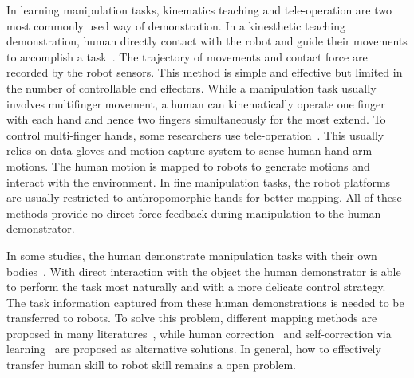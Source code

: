 In learning manipulation tasks, kinematics teaching and tele-operation are two most commonly used way of demonstration. In a kinesthetic teaching demonstration, human directly contact with the robot and guide their movements to accomplish a task~\cite{korkinof2013online,pais2014encoding,pastor2011skill,Miao2014}. The trajectory of movements and contact force are recorded by the robot sensors.
This method is simple and effective but limited in the number of controllable end effectors. While a manipulation task usually involves multifinger movement, a human can kinematically operate one finger with each hand and hence two fingers simultaneously for the most extend. To control multi-finger hands, some researchers use tele-operation~\cite{bernardino2013precision,kondo2008recognition,Fischer98}. This usually relies on data gloves and motion capture system to sense human hand-arm motions. The human motion is mapped to robots to generate motions and interact with the environment. In fine manipulation tasks, the robot platforms are usually restricted to anthropomorphic hands for better mapping. All of these methods provide no direct force feedback during manipulation to the human demonstrator.

In some studies, the human demonstrate manipulation tasks with their own bodies~\cite{asfour2008imitation}. With direct interaction with the object the human demonstrator is able to perform the task most naturally and with a more delicate control strategy. The task information captured from these human demonstrations is needed to be transferred to robots. To solve this problem, different mapping methods are proposed in many literatures~\cite{do2011towards,asfour2008imitation,hueser2006learning}, while human correction~\cite{calinon2007incremental,sauser2011iterative,romano2011human} and self-correction via learning~\cite{bidan2013robio} are proposed as alternative solutions. In general, how to effectively transfer human skill to robot skill remains a open problem.

